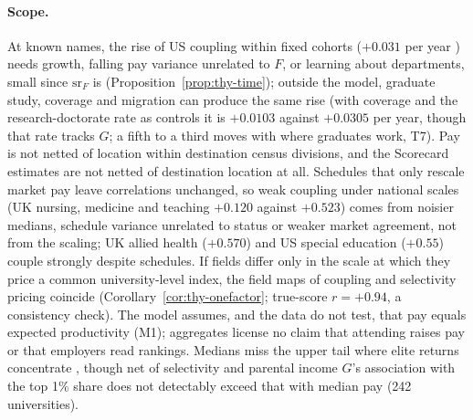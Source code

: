 \paragraph{Scope.} At known names, the rise of US coupling within fixed cohorts ($+0.031$ per year )
needs growth, falling pay variance unrelated to $F$, or learning about departments, small since $\mathrm{sr}_F$ is
(Proposition~\ref{prop:thy-time}); outside the model, graduate study, coverage and migration can produce the same
rise (with coverage and the research-doctorate rate as controls it is $+0.0103$ against $+0.0305$ per year, though
that rate tracks $G$; a fifth to a third moves with where graduates work, T7). Pay is not netted of location within
destination census divisions, and the Scorecard estimates are not netted of destination location at all.
Schedules that only rescale market pay leave correlations unchanged, so weak coupling under national scales (UK
nursing, medicine and teaching $+0.120$ against $+0.523$) comes from noisier medians, schedule variance unrelated to
status or weaker market agreement, not from the scaling; UK allied health ($+0.570$) and US special education
($+0.55$) couple strongly despite schedules. If fields differ only in the scale at which they price a common
university-level index, the field maps of coupling and selectivity pricing coincide
(Corollary~\ref{cor:thy-onefactor}; true-score $r=+0.94$, a consistency check). The model assumes, and the data do
not test, that pay equals expected productivity (M1); aggregates license no claim that attending raises pay or
that employers read rankings. Medians miss the upper tail where elite returns concentrate
\citep{chetty2023diversifying,zimmerman2019elite}, though net of selectivity and parental income $G$'s association
with the top 1\% share does not detectably exceed that with median pay (242 universities).
